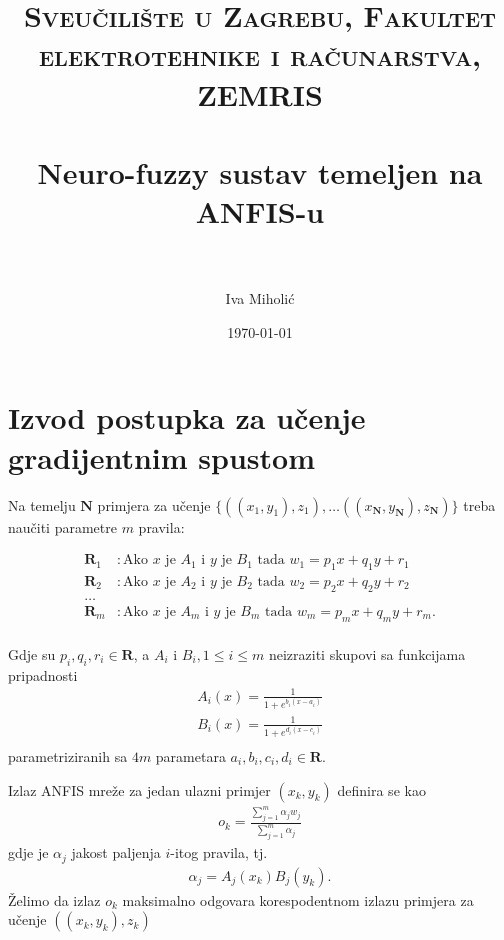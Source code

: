 \documentclass[paper=a4, fontsize=11pt]{scrartcl} %
\title{	
\normalfont \normalsize 
\textsc{Sveučilište u Zagrebu, Fakultet elektrotehnike i računarstva, ZEMRIS} \\ [25pt] %
\horrule{0.5pt} \\[0.4cm] %
\huge Neuro-fuzzy sustav temeljen na ANFIS-u \\ %
\horrule{2pt} \\[0.5cm] %
}
\author{Iva Miholić} %
\date{\normalsize\today} %
\numberwithin{equation}{section} %
\numberwithin{figure}{section} %
\numberwithin{table}{section} %
\begin{document}
\maketitle %

\section{Izvod postupka za učenje gradijentnim spustom}

Na temelju $\mathbf{N}$ primjera za učenje $\{((x_1, y_1), z_1), \dots ((x_\mathbf{N},y_\mathbf{N}), z_\mathbf{N})\}$ treba naučiti parametre $m$ pravila:

\begin{align*}
\mathbf{R}_1 &: \text{Ako }  x \text{ je } A_1 \text{ i } y \text{ je } B_1 \text{ tada } w_1 = p_1 x + q_1 y + r_1 \\
\mathbf{R}_2 &: \text{Ako }  x \text{ je } A_2 \text{ i } y \text{ je } B_2 \text{ tada } w_2 = p_2 x + q_2 y + r_2 \\
\dots& \\
\mathbf{R}_m &: \text{Ako }  x \text{ je } A_m \text{ i } y \text{ je } B_m \text{ tada } w_m = p_m x + q_m y + r_m. \\
\end{align*}

Gdje su $p_i, q_i, r_i \in \mathbf{R}$, a $A_i$ i $B_i, 1 \leq i \leq m$ neizraziti skupovi  sa funkcijama pripadnosti
\begin{align*}
A_i(x) = \frac{1}{1 + e ^ {b_i(x - a_i)}} \\
B_i(x) = \frac{1}{1 + e ^ {d_i(x - c_i)}} \\
\end{align*} parametriziranih sa  $4m$ parametara $a_i, b_i, c_i, d_i \in \mathbf{R}$.

Izlaz ANFIS mreže za jedan ulazni primjer $(x_k, y_k)$ definira se kao 
\begin{align*}
o_k = \frac{\sum_{j = 1}^{m} \alpha_j w_j}{\sum_{j = 1}^{m} \alpha_j} 
\end{align*}
gdje je $\alpha_j$ jakost paljenja $i$-itog pravila, tj.
\begin{align*}
\alpha_j = A_j(x_k) B_j(y_k).
\end{align*}
Želimo da izlaz $o_k$ maksimalno odgovara korespodentnom izlazu primjera za učenje $((x_k, y_k), z_k)$
\end{document}
